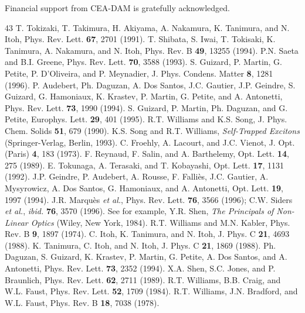 \documentclass[aps,prb,reprint]{revtex4-2}
\begin{document}
\begin{acknowledgments}
Financial support from CEA-DAM is gratefully acknowledged.
\end{acknowledgments}

\begin{thebibliography}{43}
 T. Tokizaki, T. Takimura, H. Akiyama, A. Nakamura, K. Tanimura, and N. Itoh, Phys. Rev. Lett. \textbf{67}, 2701 (1991).
 T. Shibata, S. Iwai, T. Tokisaki, K. Tanimura, A. Nakamura, and N. Itoh, Phys. Rev. B \textbf{49}, 13255 (1994).
 P.N. Saeta and B.I. Greene, Phys. Rev. Lett. \textbf{70}, 3588 (1993).
 S. Guizard, P. Martin, G. Petite, P. D'Oliveira, and P. Meynadier, J. Phys. Condens. Matter \textbf{8}, 1281 (1996).
 P. Audebert, Ph. Daguzan, A. Dos Santos, J.C. Gautier, J.P. Geindre, S. Guizard, G. Hamoniaux, K. Krastev, P. Martin, G. Petite, and A. Antonetti, Phys. Rev. Lett. \textbf{73}, 1990 (1994).
 S. Guizard, P. Martin, Ph. Daguzan, and G. Petite, Europhys. Lett. \textbf{29}, 401 (1995).
 R.T. Williams and K.S. Song, J. Phys. Chem. Solids \textbf{51}, 679 (1990).
 K.S. Song and R.T. Williams, \textit{Self-Trapped Excitons} (Springer-Verlag, Berlin, 1993).
 C. Froehly, A. Lacourt, and J.C. Vienot, J. Opt. (Paris) \textbf{4}, 183 (1973).
 F. Reynaud, F. Salin, and A. Barthelemy, Opt. Lett. \textbf{14}, 275 (1989).
 E. Tokunaga, A. Terasaki, and T. Kobayashi, Opt. Lett. \textbf{17}, 1131 (1992).
 J.P. Geindre, P. Audebert, A. Rousse, F. Falli\`es, J.C. Gautier, A. Mysyrowicz, A. Dos Santos, G. Hamoniaux, and A. Antonetti, Opt. Lett. \textbf{19}, 1997 (1994).
 J.R. Marqu\`es \textit{et al.}, Phys. Rev. Lett. \textbf{76}, 3566 (1996); C.W. Siders \textit{et al.}, \textit{ibid.} \textbf{76}, 3570 (1996).
 See for example, Y.R. Shen, \textit{The Principals of Non-Linear Optics} (Wiley, New York, 1984).
 R.T. Williams and M.N. Kabler, Phys. Rev. B \textbf{9}, 1897 (1974).
 C. Itoh, K. Tanimura, and N. Itoh, J. Phys. C \textbf{21}, 4693 (1988).
 K. Tanimura, C. Itoh, and N. Itoh, J. Phys. C \textbf{21}, 1869 (1988).
 Ph. Daguzan, S. Guizard, K. Krastev, P. Martin, G. Petite, A. Dos Santos, and A. Antonetti, Phys. Rev. Lett. \textbf{73}, 2352 (1994).
 X.A. Shen, S.C. Jones, and P. Braunlich, Phys. Rev. Lett. \textbf{62}, 2711 (1989).
 R.T. Williams, B.B. Craig, and W.L. Faust, Phys. Rev. Lett. \textbf{52}, 1709 (1984).
 R.T. Williams, J.N. Bradford, and W.L. Faust, Phys. Rev. B \textbf{18}, 7038 (1978).

\end{thebibliography}
\end{document}
